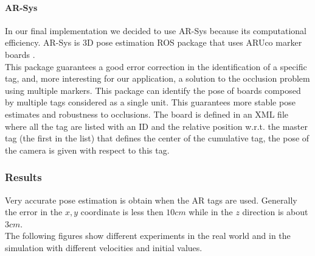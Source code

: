 \paragraph{AR-Sys}
In our final implementation we decided to use AR-Sys because its computational efficiency. AR-Sys is 3D pose estimation ROS package that uses ARUco marker boards \cite{Aruco2014}.\\
This package guarantees a good error correction in the identification of a specific tag, and, more interesting for our application, a solution to the occlusion problem using multiple markers. This package can identify the pose of boards composed by multiple tags considered as a single unit. This guarantees more stable pose estimates and robustness to occlusions. The board is defined in an XML file where all the tag are listed with an ID and the relative position w.r.t. the master tag (the first in the list) that defines the center of the cumulative tag, the pose of the camera is given with respect to this tag. 

\subsubsection{Results}
Very accurate pose estimation is obtain when the AR tags are used. Generally the error in the $x,y$ coordinate is less then $10cm$ while in the $z$ direction is about $3cm$.\\
The following figures show different experiments in the real world and in the simulation with different velocities and initial values.\\

